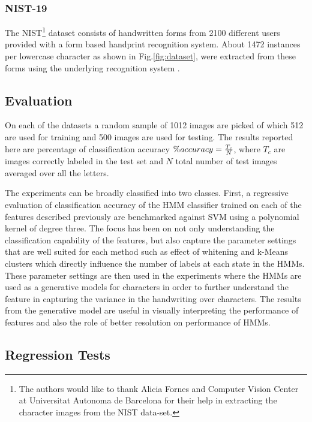 \documentclass[runningheads]{llncs}
\begin{document}
\subsubsection{NIST-19}
The NIST\footnote{The authors would like to thank Alicia Fornes and Computer Vision Center at Universitat Autonoma de Barcelona for their help in extracting the character images from the NIST data-set.} dataset consists of handwritten forms from 2100 different users provided with a form based handprint recognition system. About 1472 instances per lowercase character as shown in Fig.\ref{fig:dataset}, were extracted from these forms using the underlying recognition system \cite{NIST19}.

\subsection{Evaluation}
On each of the datasets a random sample of 1012 images are picked of which 512 are used for training and 500 images are used for testing. The results reported here are percentage of classification accuracy $\% accuracy = \frac{T_c}{N} \time 100$, where $T_c$ are images correctly labeled in the test set and $N$ total number of test images averaged over all the letters. 

The experiments can be broadly classified into two classes. First, a regressive evaluation of classification accuracy of the HMM classifier trained on each of the features described previously are benchmarked against SVM using a polynomial kernel of degree three. The focus has been on not only understanding the classification capability of the features, but also capture the parameter settings that are well suited for each method such as effect of whitening and k-Means clusters which directly influence the number of labels at each state in the HMMs. These parameter settings are then used in the experiments where the HMMs are used as a generative models for characters in order to further understand the feature in capturing the variance in the handwriting over characters. The results from the generative model are useful in visually interpreting the performance of features and also the role of better resolution on performance of HMMs.

\label{ssec:eval}
\subsection{Regression Tests}
\end{document}
